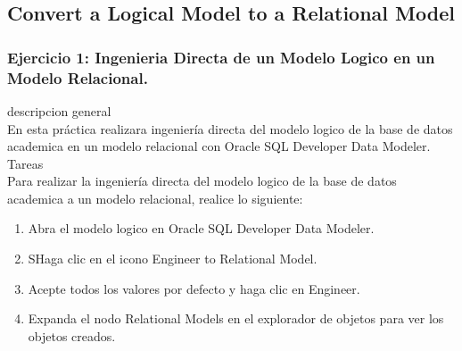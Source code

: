 \documentclass[12pt,letterpaper]{article}
\begin{document}
 \newpage
\subsection{Convert a Logical Model to a Relational Model}
 \newpage
\subsubsection{Ejercicio 1: Ingenieria Directa de un Modelo Logico en un Modelo Relacional.} 
descripcion general  \\
En esta práctica realizara ingeniería directa del modelo logico de la base de datos academica en un modelo relacional con Oracle SQL Developer Data Modeler. \\

Tareas\\
Para realizar la ingeniería directa del modelo logico de la base de datos academica a un modelo relacional, realice lo siguiente:
\begin{enumerate}[1.]
    \item  Abra el modelo logico en Oracle SQL Developer Data Modeler. 
     
    \item SHaga clic en el icono Engineer to Relational Model.
    
    \item Acepte todos los valores por defecto y haga clic en Engineer.
    
     \item Expanda el nodo Relational Models en el explorador de objetos para ver los objetos creados.
		\end{enumerate}
\end{document}
